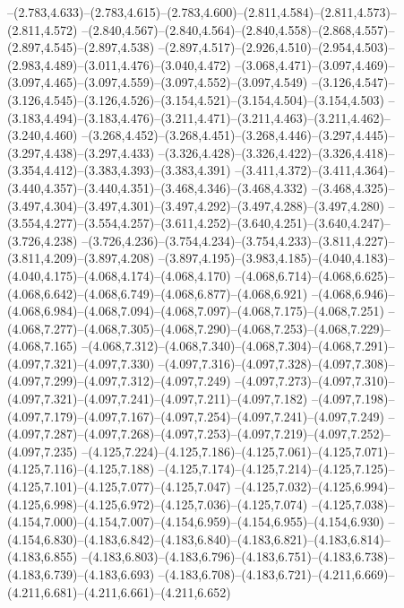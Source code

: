   --(2.783,4.633)--(2.783,4.615)--(2.783,4.600)--(2.811,4.584)--(2.811,4.573)--(2.811,4.572)%
  --(2.840,4.567)--(2.840,4.564)--(2.840,4.558)--(2.868,4.557)--(2.897,4.545)--(2.897,4.538)%
  --(2.897,4.517)--(2.926,4.510)--(2.954,4.503)--(2.983,4.489)--(3.011,4.476)--(3.040,4.472)%
  --(3.068,4.471)--(3.097,4.469)--(3.097,4.465)--(3.097,4.559)--(3.097,4.552)--(3.097,4.549)%
  --(3.126,4.547)--(3.126,4.545)--(3.126,4.526)--(3.154,4.521)--(3.154,4.504)--(3.154,4.503)%
  --(3.183,4.494)--(3.183,4.476)--(3.211,4.471)--(3.211,4.463)--(3.211,4.462)--(3.240,4.460)%
  --(3.268,4.452)--(3.268,4.451)--(3.268,4.446)--(3.297,4.445)--(3.297,4.438)--(3.297,4.433)%
  --(3.326,4.428)--(3.326,4.422)--(3.326,4.418)--(3.354,4.412)--(3.383,4.393)--(3.383,4.391)%
  --(3.411,4.372)--(3.411,4.364)--(3.440,4.357)--(3.440,4.351)--(3.468,4.346)--(3.468,4.332)%
  --(3.468,4.325)--(3.497,4.304)--(3.497,4.301)--(3.497,4.292)--(3.497,4.288)--(3.497,4.280)%
  --(3.554,4.277)--(3.554,4.257)--(3.611,4.252)--(3.640,4.251)--(3.640,4.247)--(3.726,4.238)%
  --(3.726,4.236)--(3.754,4.234)--(3.754,4.233)--(3.811,4.227)--(3.811,4.209)--(3.897,4.208)%
  --(3.897,4.195)--(3.983,4.185)--(4.040,4.183)--(4.040,4.175)--(4.068,4.174)--(4.068,4.170)%
  --(4.068,6.714)--(4.068,6.625)--(4.068,6.642)--(4.068,6.749)--(4.068,6.877)--(4.068,6.921)%
  --(4.068,6.946)--(4.068,6.984)--(4.068,7.094)--(4.068,7.097)--(4.068,7.175)--(4.068,7.251)%
  --(4.068,7.277)--(4.068,7.305)--(4.068,7.290)--(4.068,7.253)--(4.068,7.229)--(4.068,7.165)%
  --(4.068,7.312)--(4.068,7.340)--(4.068,7.304)--(4.068,7.291)--(4.097,7.321)--(4.097,7.330)%
  --(4.097,7.316)--(4.097,7.328)--(4.097,7.308)--(4.097,7.299)--(4.097,7.312)--(4.097,7.249)%
  --(4.097,7.273)--(4.097,7.310)--(4.097,7.321)--(4.097,7.241)--(4.097,7.211)--(4.097,7.182)%
  --(4.097,7.198)--(4.097,7.179)--(4.097,7.167)--(4.097,7.254)--(4.097,7.241)--(4.097,7.249)%
  --(4.097,7.287)--(4.097,7.268)--(4.097,7.253)--(4.097,7.219)--(4.097,7.252)--(4.097,7.235)%
  --(4.125,7.224)--(4.125,7.186)--(4.125,7.061)--(4.125,7.071)--(4.125,7.116)--(4.125,7.188)%
  --(4.125,7.174)--(4.125,7.214)--(4.125,7.125)--(4.125,7.101)--(4.125,7.077)--(4.125,7.047)%
  --(4.125,7.032)--(4.125,6.994)--(4.125,6.998)--(4.125,6.972)--(4.125,7.036)--(4.125,7.074)%
  --(4.125,7.038)--(4.154,7.000)--(4.154,7.007)--(4.154,6.959)--(4.154,6.955)--(4.154,6.930)%
  --(4.154,6.830)--(4.183,6.842)--(4.183,6.840)--(4.183,6.821)--(4.183,6.814)--(4.183,6.855)%
  --(4.183,6.803)--(4.183,6.796)--(4.183,6.751)--(4.183,6.738)--(4.183,6.739)--(4.183,6.693)%
  --(4.183,6.708)--(4.183,6.721)--(4.211,6.669)--(4.211,6.681)--(4.211,6.661)--(4.211,6.652)%
